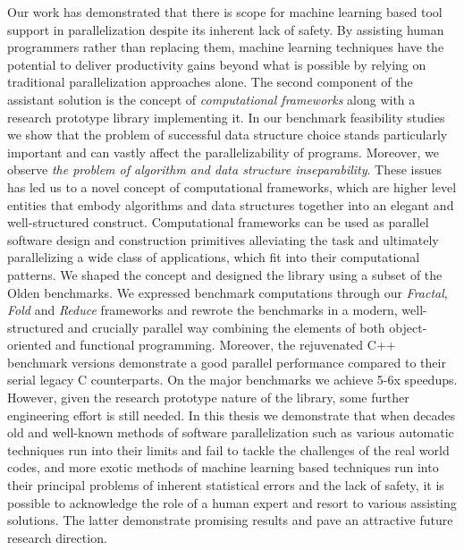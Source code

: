 \quad Our work has demonstrated that there is scope for machine learning based tool support in parallelization despite its inherent lack of safety. By assisting human programmers rather than replacing them, machine learning techniques have the potential to deliver productivity gains beyond what is possible by relying on traditional parallelization approaches alone.\newline\null
\quad The second component of the assistant solution is the concept of \textit{computational frameworks} along with a research prototype library implementing it. In our benchmark feasibility studies we show that the problem of successful data structure choice stands particularly important and can vastly affect the parallelizability of programs. Moreover, we observe \textit{the problem of algorithm and data structure inseparability}. These issues has led us to a novel concept of computational frameworks, which are higher level entities that embody algorithms and data structures together into an elegant and well-structured construct. Computational frameworks can be used as parallel software design and construction primitives alleviating the task and ultimately parallelizing a wide class of applications, which fit into their computational patterns.\newline\null
\quad We shaped the concept and designed the library using a subset of the Olden benchmarks. We expressed benchmark computations through our \textit{Fractal}, \textit{Fold} and \textit{Reduce} frameworks and rewrote the benchmarks in a modern, well-structured and crucially parallel way combining the elements of both object-oriented and functional programming. Moreover, the rejuvenated C++ benchmark versions demonstrate a good parallel performance compared to their serial legacy C counterparts. On the major benchmarks we achieve 5-6x speedups. However, given the research prototype nature of the library, some further engineering effort is still needed.\newline\null
\quad In this thesis we demonstrate that when decades old and well-known methods of software parallelization such as various automatic techniques run into their limits and fail to tackle the challenges of the real world codes, and more exotic methods of machine learning based techniques run into their principal problems of inherent statistical errors and the lack of safety, it is possible to acknowledge the role of a human expert and resort to various assisting solutions. The latter demonstrate promising results and pave an attractive future research direction.

%